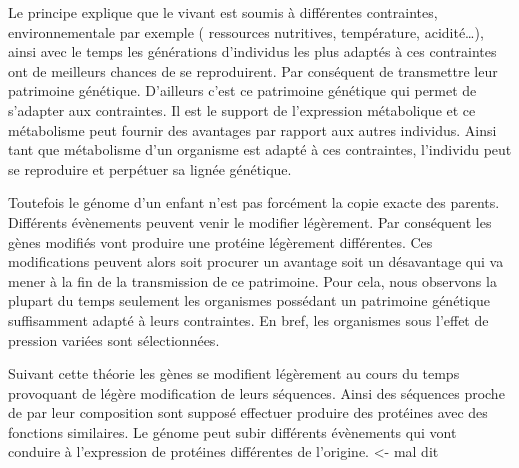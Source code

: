 \begin{refsection}
    Le principe explique que le vivant est soumis à différentes contraintes, environnementale par exemple ( ressources nutritives, température, acidité\ldots ), ainsi avec le temps les générations d’individus les plus adaptés à ces contraintes ont de meilleurs chances de se reproduirent. Par conséquent de transmettre leur patrimoine génétique. D’ailleurs c’est ce patrimoine génétique qui permet de s’adapter aux contraintes. Il est le support de l’expression métabolique et ce métabolisme peut fournir des avantages par rapport aux autres individus. Ainsi tant que métabolisme d’un organisme est adapté à ces contraintes, l’individu peut se reproduire et perpétuer sa lignée génétique.
    
    Toutefois le génome d’un enfant n’est pas forcément la copie exacte des parents. Différents évènements peuvent venir le modifier légèrement. Par conséquent les gènes modifiés vont produire une protéine légèrement différentes. Ces modifications peuvent alors soit procurer un avantage soit un désavantage qui va mener à la fin de la transmission de ce patrimoine. Pour cela, nous observons la plupart du temps seulement les organismes possédant un patrimoine génétique suffisamment adapté à leurs contraintes. En bref, les organismes sous l’effet de pression variées sont sélectionnées.
    
    Suivant cette théorie les gènes se modifient légèrement au cours du temps provoquant de légère modification de leurs séquences. Ainsi des séquences proche de par leur composition sont supposé effectuer produire des protéines avec des fonctions similaires. Le génome peut subir différents évènements qui vont conduire à l’expression de protéines différentes de l’origine. <- mal dit
    

\end{refsection}
